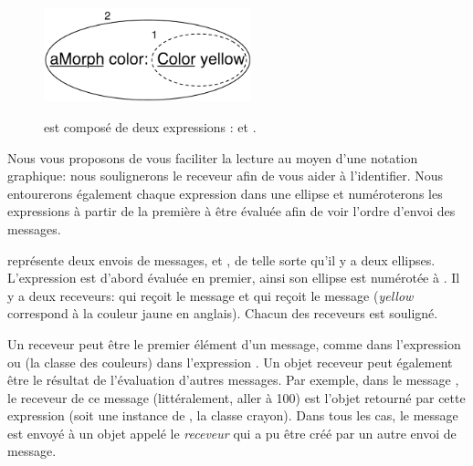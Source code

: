 \documentclass[a4paper,10pt,twoside]{book}
\begin{document}
\begin{figure}[htb]
\begin{minipage}{0.43\textwidth}
\begin{center}
		{\includegraphics[width=6cm]{uKeyUnOne}}
	\caption{ est composé de deux expressions :  et .}
	\end{center}
\end{minipage}
\end{figure}



Nous vous proposons de vous faciliter la lecture au moyen d'une
notation graphique: nous soulignerons le receveur afin de vous aider
à l'identifier. Nous entourerons également chaque expression dans
une ellipse et numéroterons les expressions à partir de la
première à être évaluée afin de voir l'ordre d'envoi des messages.


 représente deux envois de messages,  et , 
de telle sorte qu'il y a deux ellipses. 
L'expression  est d'abord évaluée
en premier, ainsi son ellipse est numérotée à . Il y a
deux receveurs:  qui reçoit le message 
et  qui reçoit le message  
(\emph{yellow} correspond à la couleur jaune en anglais). 
Chacun des receveurs est souligné.

Un receveur peut être le premier élément d'un message, comme
 dans l'expression  ou  
(la classe des couleurs)
dans l'expression . Un objet receveur peut
également être le résultat de l'évaluation d'autres
messages. Par exemple, dans le message , le
receveur de ce message  
(littéralement, aller à 100)
est l'objet retourné par cette expression  
(soit une instance de , la classe crayon). Dans tous les cas,
le message est envoyé à un objet appelé le \emph{receveur} qui a
pu être créé par un autre envoi de message.
\end{document}
